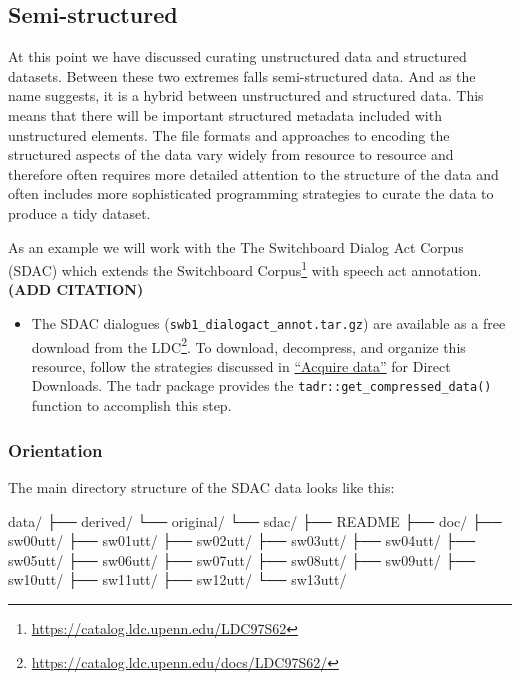 \documentclass[
]{article}
\newenvironment{Shaded}{\begin{snugshade}}{\end{snugshade}}
\newcommand{\ExtensionTok}[1]{#1}
\newcommand{\NormalTok}[1]{#1}
\DeclareRobustCommand{\href}[2]{#2\footnote{\url{#1}}}
\newenvironment{rmdblock}[1]
  {\begin{shaded*}
  \begin{itemize}
  \renewcommand{\labelitemi}{
    \raisebox{-.5\height}[0pt][0pt]{
      {\setkeys{Gin}{width=2em,keepaspectratio}\texttt{[image: assets/images/\#1]}}
    }
  }
  \item
  }
  {
  \end{itemize}
  \end{shaded*}
  }
\newenvironment{rmdtip}
  {\begin{rmdblock}{tip}}
  {\end{rmdblock}}
\begin{document}
\hypertarget{semi-structured}{%
\subsection{Semi-structured}\label{semi-structured}}

At this point we have discussed curating unstructured data and structured datasets. Between these two extremes falls semi-structured data. And as the name suggests, it is a hybrid between unstructured and structured data. This means that there will be important structured metadata included with unstructured elements. The file formats and approaches to encoding the structured aspects of the data vary widely from resource to resource and therefore often requires more detailed attention to the structure of the data and often includes more sophisticated programming strategies to curate the data to produce a tidy dataset.

As an example we will work with the The Switchboard Dialog Act Corpus (SDAC) which extends the \href{https://catalog.ldc.upenn.edu/LDC97S62}{Switchboard Corpus} with speech act annotation. \textbf{(ADD CITATION)}

\begin{rmdtip}
The SDAC dialogues (\texttt{swb1\_dialogact\_annot.tar.gz}) are
available as a \href{https://catalog.ldc.upenn.edu/docs/LDC97S62/}{free
download from the LDC}. To download, decompress, and organize this
resource, follow the strategies discussed in
\protect\hyperlink{acquire-data}{``Acquire data''} for Direct Downloads.
The tadr package provides the \texttt{tadr::get\_compressed\_data()}
function to accomplish this step.
\end{rmdtip}

\hypertarget{orientation-2}{%
\subsubsection{Orientation}\label{orientation-2}}

The main directory structure of the SDAC data looks like this:

\begin{Shaded}
\begin{Highlighting}[]
\ExtensionTok{data/}
\ExtensionTok{├──}\NormalTok{ derived/}
\ExtensionTok{└──}\NormalTok{ original/}
    \ExtensionTok{└──}\NormalTok{ sdac/}
        \ExtensionTok{├──}\NormalTok{ README}
        \ExtensionTok{├──}\NormalTok{ doc/}
        \ExtensionTok{├──}\NormalTok{ sw00utt/}
        \ExtensionTok{├──}\NormalTok{ sw01utt/}
        \ExtensionTok{├──}\NormalTok{ sw02utt/}
        \ExtensionTok{├──}\NormalTok{ sw03utt/}
        \ExtensionTok{├──}\NormalTok{ sw04utt/}
        \ExtensionTok{├──}\NormalTok{ sw05utt/}
        \ExtensionTok{├──}\NormalTok{ sw06utt/}
        \ExtensionTok{├──}\NormalTok{ sw07utt/}
        \ExtensionTok{├──}\NormalTok{ sw08utt/}
        \ExtensionTok{├──}\NormalTok{ sw09utt/}
        \ExtensionTok{├──}\NormalTok{ sw10utt/}
        \ExtensionTok{├──}\NormalTok{ sw11utt/}
        \ExtensionTok{├──}\NormalTok{ sw12utt/}
        \ExtensionTok{└──}\NormalTok{ sw13utt/}
\end{Highlighting}
\end{Shaded}
\end{document}
